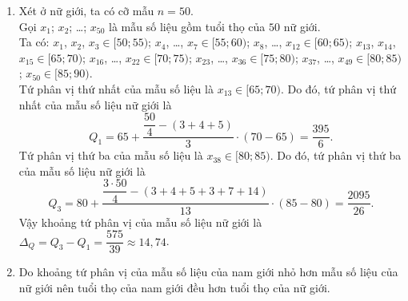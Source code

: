 \begin{ex}
{\begin{enumerate}
			Gọi $x_1$; $x_2$; \ldots; $x_{50}$ là mẫu số liệu gồm tuổi thọ của $50$ nam giới.\\
			Ta có: $x_1$, \ldots, $x_4\in[50;55)$; $x_5$, \ldots, $x_{11}\in[55;60)$; $x_{12}$, \ldots, $x_{15}\in[60;65)$; $x_{16}$, \ldots, $x_{21}\in[65;70)$; $x_{22}$, \ldots, $x_{36}\in[70;75)$; $x_{37}$, \ldots, $x_{48}\in[75;80)$; $x_{49}$, $x_{50}\in[80;85)$.\\
			Tứ phân vị thứ nhất của mẫu số liệu là $x_{13}\in[60;65)$. Do đó, tứ phân vị thứ nhất của mẫu số liệu nam giới là
			$$Q_1=60+\dfrac{\dfrac{50}{4}-(4+7)}{4}\cdot(65-60)=\dfrac{495}{8}.$$
			Tứ phân vị thứ ba của mẫu số liệu là $x_{38}\in[75;80)$. Do đó, tứ phân vị thứ ba của mẫu số liệu nam giới là
			$$Q_3=75+\dfrac{\dfrac{3\cdot50}{4}-(4+7+4+6+15)}{12}\cdot(80-75)=\dfrac{605}{8}.$$
			Vậy khoảng tứ phân vị của mẫu số liệu nam giới là $\Delta_Q=Q_3-Q_1=\dfrac{55}{4}=13{,}75$.
			\item Xét ở nữ giới, ta có cỡ mẫu $n=50$.\\
			Gọi $x_1$; $x_2$; \ldots; $x_{50}$ là mẫu số liệu gồm tuổi thọ của $50$ nữ giới.\\
			Ta có: $x_1$, $x_2$, $x_3\in[50;55)$; $x_4$, \ldots, $x_7\in[55;60)$; $x_8$, \ldots, $x_{12}\in[60;65)$; $x_{13}$, $x_{14}$, $x_{15}\in[65;70)$; $x_{16}$, \ldots, $x_{22}\in[70;75)$; $x_{23}$, \ldots, $x_{36}\in[75;80)$; $x_{37}$, \ldots, $x_{49}\in[80;85)$; $x_{50}\in[85;90)$.\\
			Tứ phân vị thứ nhất của mẫu số liệu là $x_{13}\in[65;70)$. Do đó, tứ phân vị thứ nhất của mẫu số liệu nữ giới là
			$$Q_1=65+\dfrac{\dfrac{50}{4}-(3+4+5)}{3}\cdot(70-65)=\dfrac{395}{6}.$$
			Tứ phân vị thứ ba của mẫu số liệu là $x_{38}\in[80;85)$. Do đó, tứ phân vị thứ ba của mẫu số liệu nữ giới là
			$$Q_3=80+\dfrac{\dfrac{3\cdot50}{4}-(3+4+5+3+7+14)}{13}\cdot(85-80)=\dfrac{2095}{26}.$$
			Vậy khoảng tứ phân vị của mẫu số liệu nữ giới là $\Delta_Q=Q_3-Q_1=\dfrac{575}{39}\approx14{,}74$.
			\item Do khoảng tứ phân vị của mẫu số liệu của nam giới nhỏ hơn mẫu số liệu của nữ giới nên tuổi thọ của nam giới đều hơn tuổi thọ của nữ giới.
	\end{enumerate}}
\end{ex}

